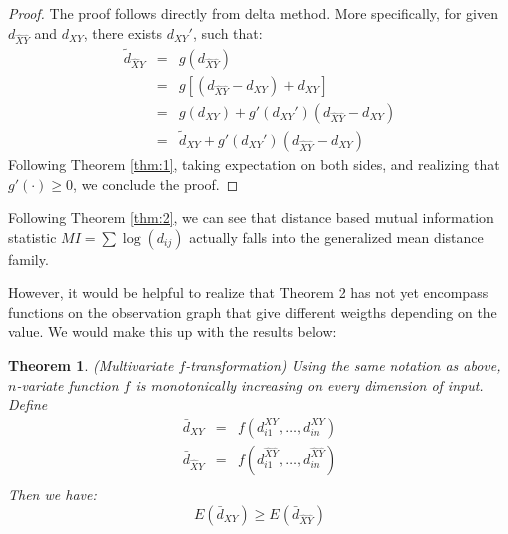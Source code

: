 \documentclass[12pt,letterpaper]{article}
\newtheorem{thm}{Theorem}
\begin{document}
\begin{proof}
  The proof follows directly from delta method. More specifically, for
  given $d_{\hat{X}\hat{Y}}$ and $d_{XY}$, there exists $d_{XY}'$, such that: 
  \begin{eqnarray*}
    \tilde{d}_{\hat{X}\hat{Y}} &=& g(d_{\hat{X}\hat{Y}})\\
                               &=& g
                                   \left[
                                   (d_{\hat{X}\hat{Y}} - d_{XY}) + d_{XY}
                                   \right] \\
                               &=& g(d_{XY}) + g'(d_{XY}') (d_{\hat{X}\hat{Y}} - d_{XY})\\
                               &=& \tilde{d}_{XY} + g'(d_{XY}') (d_{\hat{X}\hat{Y}} - d_{XY})
  \end{eqnarray*}
  Following Theorem \ref{thm:1}, taking expectation on both sides, and
  realizing that $g'(\cdot) \ge 0$, we conclude the proof.
\end{proof}

Following Theorem \ref{thm:2}, we can see that distance based mutual
information statistic $MI = \sum \log(d_{ij})$ actually falls into the
generalized mean distance family.

However, it would be helpful to realize that Theorem 2 has not yet
encompass functions on the observation graph that give different
weigths depending on the value. We would make this up with the results below: 

\begin{thm}
  \label{thm:3}
  (Multivariate $f$-transformation) Using the same notation as above,
  $n$-variate function $f$ is monotonically increasing on every
  dimension of input. Define
  \begin{eqnarray*}
    \bar{d}_{XY} &=& f(d^{XY}_{i1},\ldots,d^{XY}_{in})\\ 
    \bar{d}_{\hat{X}\hat{Y}} &=& f(d^{\hat{X}\hat{Y}}_{i1},\ldots,d^{\hat{X}\hat{Y}}_{in})\\
  \end{eqnarray*}
  Then we have:
  \begin{displaymath}
    E(\bar{d}_{XY}) \ge E(\bar{d}_{\hat{X}\hat{Y}})
  \end{displaymath}
\end{thm}
\end{document}
